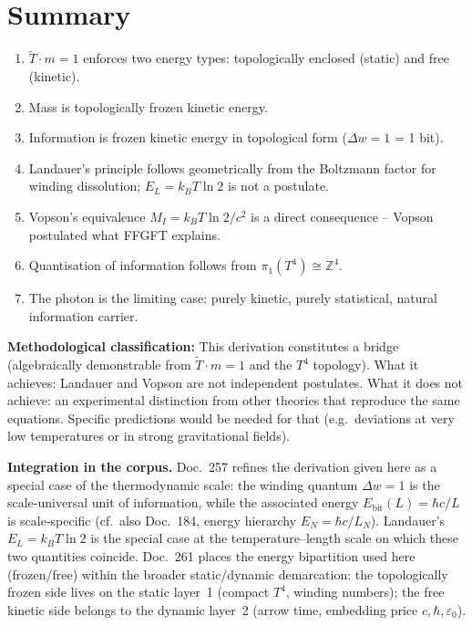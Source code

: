 \section{Summary}

\begin{enumerate}
  \item \(\tilde{T} \cdot m = 1\) enforces two energy types:
        topologically enclosed (static) and free (kinetic).
  \item Mass is topologically frozen kinetic energy.
  \item Information is frozen kinetic energy in topological form
        (\(\Delta w = 1\) = 1 bit).
  \item Landauer's principle follows geometrically from the
        Boltzmann factor for winding dissolution;
        \(E_L = k_BT\ln 2\) is not a postulate.
  \item Vopson's equivalence \(M_I = k_BT\ln2/c^2\) is a direct
        consequence -- Vopson postulated what FFGFT explains.
  \item Quantisation of information follows from
        \(\pi_1(T^4)\cong\mathbb{Z}^4\).
  \item The photon is the limiting case: purely kinetic, purely
        statistical, natural information carrier.
\end{enumerate}

\bigskip
\noindent
\textbf{Methodological classification:}
This derivation constitutes a bridge (algebraically demonstrable
from \(\tilde{T}\cdot m=1\) and the \(T^4\) topology).
What it achieves: Landauer and Vopson are not independent postulates.
What it does not achieve: an experimental distinction from other theories
that reproduce the same equations.
Specific predictions would be needed for that (e.g.\ deviations at
very low temperatures or in strong gravitational fields).

\bigskip
\noindent
\textbf{Integration in the corpus.}
Doc.~257 refines the derivation given here as a special case of the
thermodynamic scale: the winding quantum \(\Delta w = 1\) is the
scale-universal unit of information, while the associated energy
\(E_\text{bit}(L) = \hbar c/L\) is scale-specific
(cf.\ also Doc.~184, energy hierarchy \(E_N = \hbar c/L_N\)).
Landauer's \(E_L = k_B T \ln 2\) is the special case at the
temperature--length scale on which these two quantities coincide.
Doc.~261 places the energy bipartition used here (frozen/free)
within the broader static/dynamic demarcation: the topologically
frozen side lives on the static layer~1 (compact \(T^4\), winding
numbers); the free kinetic side belongs to the dynamic layer~2
(arrow time, embedding price \(c,\hbar,\varepsilon_0\)).

